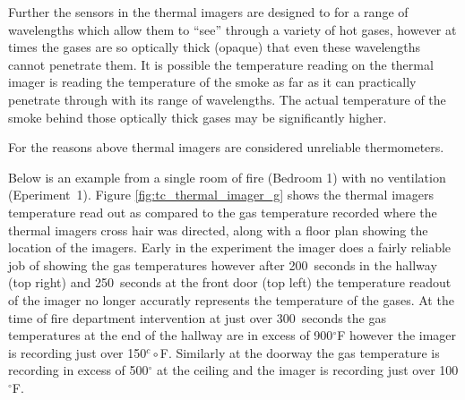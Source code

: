 \documentclass[12pt,oneside]{book}
\begin{document}
Further the sensors in the thermal imagers are designed to for a range of wavelengths which allow them to ``see'' through a variety of hot gases, however at times the gases are so optically thick (opaque) that even these wavelengths cannot penetrate them. It is possible the temperature reading on the thermal imager is reading the temperature of the smoke as far as it can practically penetrate through with its range of wavelengths. The actual temperature of the smoke behind those optically thick gases may be significantly higher. 


For the reasons above thermal imagers are considered unreliable thermometers.

Below is an example from a single room of fire (Bedroom 1) with no ventilation (Eperiment~1). Figure \ref{fig:tc_thermal_imager_g} shows the thermal imagers temperature read out as compared to the gas temperature recorded where the thermal imagers cross hair was directed, along with a floor plan showing the location of the imagers. Early in the experiment the imager does a fairly reliable job of showing the gas temperatures however after 200~seconds in the hallway (top right) and 250~seconds at the front door (top left) the temperature readout of the imager no longer accuratly represents the temperature of the gases. At the time of fire department intervention at just over 300~seconds the gas temperatures at the end of the hallway are in excess of 900$^\circ$F however the imager is recording just over 150$^c\circ$F. Similarly at the doorway the gas temperature is recording in excess of 500$^\circ$ at the ceiling and the imager is recording just over 100$^\circ$F. 


\end{document}
